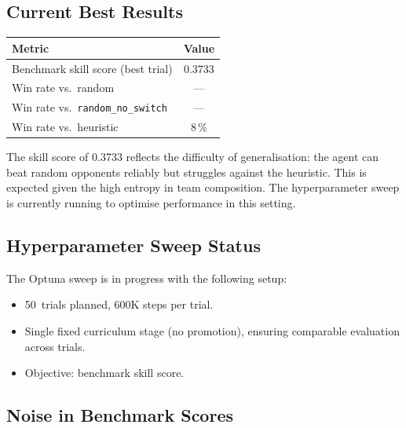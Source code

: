 \subsection{Current Best Results}

\begin{center}
\small
\begin{tabularx}{0.8\textwidth}{l c}
  \toprule
  \textbf{Metric} & \textbf{Value} \\
  \midrule
  Benchmark skill score (best trial) & 0.3733 \\
  Win rate vs.\ random              & --- \\
  Win rate vs.\ \texttt{random\_no\_switch} & --- \\
  Win rate vs.\ heuristic           & 8\,\% \\
  \bottomrule
\end{tabularx}
\end{center}


The skill score of 0.3733 reflects the difficulty of generalisation: the
agent can beat random opponents reliably but struggles against the heuristic.
This is expected given the high entropy in team composition.  The
hyperparameter sweep is currently running to optimise
performance in this setting.

\subsection{Hyperparameter Sweep Status}

The Optuna sweep is in progress with the following setup:
\begin{itemize}
  \item 50~trials planned, 600K steps per trial.
  \item Single fixed curriculum stage (no promotion), ensuring comparable
        evaluation across trials.
  \item Objective: benchmark skill score.
\end{itemize}


\subsection{Noise in Benchmark Scores}

